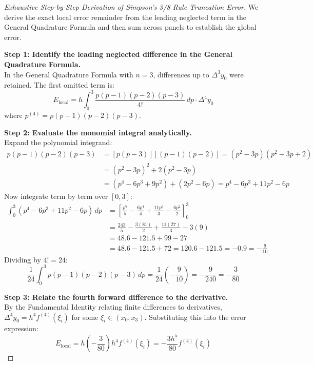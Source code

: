 \begin{proof}[Exhaustive Step-by-Step Derivation of Simpson's 3/8 Rule Truncation Error]
We derive the exact local error remainder from the leading neglected term in the General Quadrature Formula and then sum across panels to establish the global error.

\medskip
\noindent\textbf{Step 1: Identify the leading neglected difference in the General Quadrature Formula.} \\
In the General Quadrature Formula with $n = 3$, differences up to $\Delta^3 y_0$ were retained. The first omitted term is:
\begin{equation}
    E_{\text{local}} = h \int_0^3 \frac{p(p-1)(p-2)(p-3)}{4!} \, dp \cdot \Delta^4 y_0
\end{equation}
where $p^{(4)} = p(p-1)(p-2)(p-3)$.

\medskip
\noindent\textbf{Step 2: Evaluate the monomial integral analytically.} \\
Expand the polynomial integrand:
\begin{align}
    p(p-1)(p-2)(p-3) &= [p(p-3)][(p-1)(p-2)] = (p^2 - 3p)(p^2 - 3p + 2) \nonumber \\
    &= (p^2 - 3p)^2 + 2(p^2 - 3p) \nonumber \\
    &= (p^4 - 6p^3 + 9p^2) + (2p^2 - 6p) = p^4 - 6p^3 + 11p^2 - 6p
\end{align}
Now integrate term by term over $[0, 3]$:
\begin{align}
    \int_0^3 (p^4 - 6p^3 + 11p^2 - 6p) \, dp &= \left[ \frac{p^5}{5} - \frac{6p^4}{4} + \frac{11p^3}{3} - \frac{6p^2}{2} \right]_0^3 \nonumber \\
    &= \frac{243}{5} - \frac{3(81)}{2} + \frac{11(27)}{3} - 3(9) \nonumber \\
    &= 48.6 - 121.5 + 99 - 27 \nonumber \\
    &= 48.6 - 121.5 + 72 = 120.6 - 121.5 = -0.9 = -\frac{9}{10}
\end{align}
Dividing by $4! = 24$:
\begin{equation}
    \frac{1}{24} \int_0^3 p(p-1)(p-2)(p-3) \, dp = \frac{1}{24}\left( -\frac{9}{10} \right) = -\frac{9}{240} = -\frac{3}{80}
\end{equation}

\medskip
\noindent\textbf{Step 3: Relate the fourth forward difference to the derivative.} \\
By the Fundamental Identity relating finite differences to derivatives, $\Delta^4 y_0 = h^4 f^{(4)}(\xi_i)$ for some $\xi_i \in (x_0, x_3)$.
Substituting this into the error expression:
\begin{equation}
    \boxed{E_{\text{local}} = h \left( -\frac{3}{80} \right) h^4 f^{(4)}(\xi_i) = -\frac{3 h^5}{80} f^{(4)}(\xi_i)}
\end{equation}


\end{proof}

